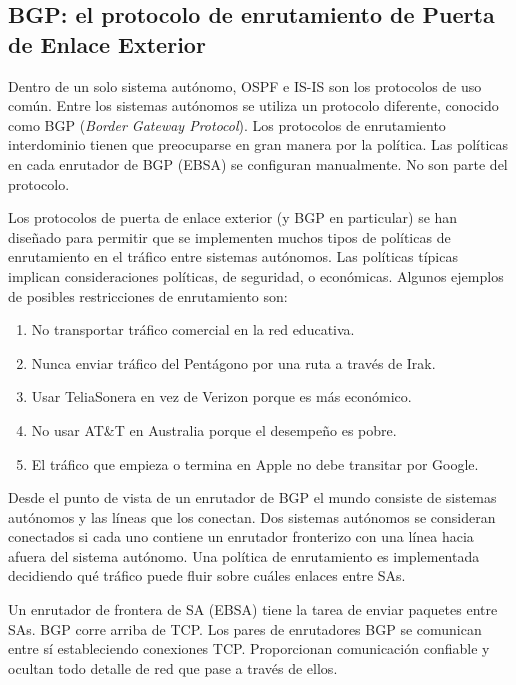 \documentclass[10pt,a4paper]{report}
\begin{document}
\subsection{BGP: el protocolo de enrutamiento de Puerta de Enlace Exterior}
	
	\par Dentro de un solo sistema autónomo, OSPF e IS-IS son los protocolos de uso común. Entre los sistemas autónomos se utiliza un protocolo diferente, conocido como BGP (\textit{Border Gateway Protocol}). Los protocolos de enrutamiento interdominio tienen que preocuparse en gran manera por la política. Las políticas en cada enrutador de BGP (EBSA) se configuran manualmente. No son parte del protocolo.
	
	\par Los protocolos de puerta de enlace exterior (y BGP en particular) se han diseñado para permitir que se implementen muchos tipos de políticas de enrutamiento en el tráfico entre sistemas autónomos. Las políticas típicas implican consideraciones políticas, de seguridad, o económicas. Algunos ejemplos de posibles restricciones de enrutamiento son:
		\begin{enumerate}
			\item  No transportar tráfico comercial en la red educativa.
			\item Nunca enviar tráfico del Pentágono por una ruta a través de Irak.
			\item Usar TeliaSonera en vez de Verizon porque es más económico.
			\item No usar AT\&T en Australia porque el desempeño es pobre.
			\item El tráfico que empieza o termina en Apple no debe transitar por Google.
		\end{enumerate}
	
	\par Desde el punto de vista de un enrutador de BGP el mundo consiste de sistemas autónomos y las líneas que los conectan. Dos sistemas autónomos se consideran conectados si cada uno contiene un enrutador fronterizo con una línea hacia afuera del sistema autónomo. Una política de enrutamiento es implementada decidiendo qué tráfico puede fluir sobre cuáles enlaces entre SAs.

	\par Un enrutador de frontera de SA (EBSA) tiene la tarea de enviar paquetes entre SAs. BGP corre arriba de TCP. Los pares de enrutadores BGP se comunican entre sí estableciendo conexiones TCP. Proporcionan comunicación confiable y ocultan todo detalle de red que pase a través de ellos.
\end{document}
